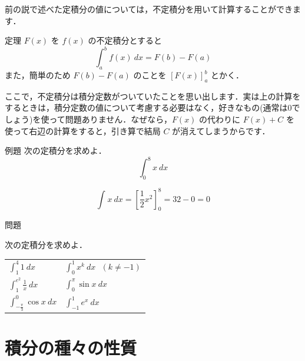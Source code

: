\documentclass[
  b4paperpaper,
  xelatex,ja=standard]{bxjsbook}
\begin{document}
前の説で述べた定積分の値については，不定積分を用いて計算することができます．

\begin{Tbox}{定理}
\(F(x)\) を \(f(x)\) の不定積分とすると
\[\displaystyle\int_{a}^{b}f(x)\ dx=F(b)-F(a)\] また，簡単のため
\(F(b)-F(a)\) のことを \(\left[F(x)\right]_{a}^{b}\) とかく．

\end{Tbox}

ここで，不定積分は積分定数がついていたことを思い出します．実は上の計算をするときは，積分定数の値について考慮する必要はなく，好きなもの(通常は0でしょう)を使って問題ありません．なぜなら，\(F(x)\)
の代わりに \(F(x)+C\) を使って右辺の計算をすると，引き算で結局 \(C\)
が消えてしまうからです．

\begin{Rbox}{例題}
次の定積分を求めよ． \[\displaystyle\int_{0}^{8}x\ dx \]

\end{Rbox}


\[\displaystyle\int_{}^{}x\ dx = \left[\displaystyle\frac{1}{2}x^2\right]_{0}^{8}=32-0=0\]

\begin{Qbox}{問題}

次の定積分を求めよ．

\begin{longtable}[]{@{}
  >{\raggedright\arraybackslash}p{}
  >{\raggedright\arraybackslash}p{}@{}}
\toprule\noalign{}
\endhead
\bottomrule\noalign{}
\endlastfoot
\(\displaystyle\int_{1}^{4}1\ dx\) &
\(\displaystyle\int_{0}^{1}x^k\ dx\ \ \  ( k\neq -1 )\) \\
\(\displaystyle\int_{1}^{e^2}\displaystyle\frac{1}{x}\ dx\) &
\(\displaystyle\int_{0}^{\pi} \sin x\ dx\) \\
\(\displaystyle\int_{-\frac{\pi}{3}}^{0}\cos x\ dx\) &
\(\displaystyle\int_{-1}^{1} e^x\ dx\) \\
\end{longtable}

\end{Qbox}


\hypertarget{ux7a4dux5206ux306eux7a2eux3005ux306eux6027ux8cea}{%
\section{積分の種々の性質}\label{ux7a4dux5206ux306eux7a2eux3005ux306eux6027ux8cea}}
\end{document}
